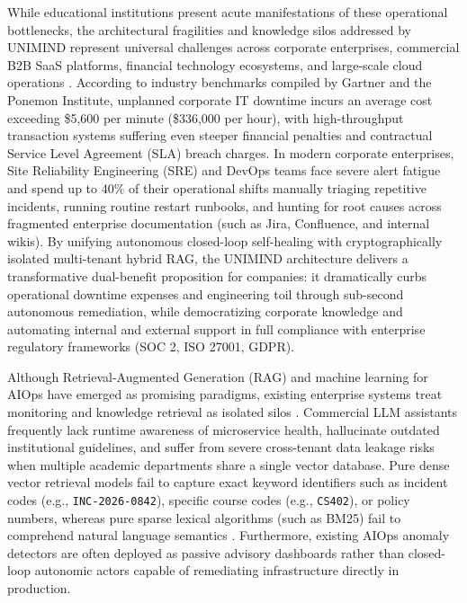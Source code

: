 \documentclass[12pt,onecolumn,draftclsnofoot]{IEEEtran}
\begin{document}
While educational institutions present acute manifestations of these operational bottlenecks, the architectural fragilities and knowledge silos addressed by UNIMIND represent universal challenges across corporate enterprises, commercial B2B SaaS platforms, financial technology ecosystems, and large-scale cloud operations \cite{beyer2016site}. According to industry benchmarks compiled by Gartner and the Ponemon Institute, unplanned corporate IT downtime incurs an average cost exceeding \$5,600 per minute (\$336,000 per hour), with high-throughput transaction systems suffering even steeper financial penalties and contractual Service Level Agreement (SLA) breach charges. In modern corporate enterprises, Site Reliability Engineering (SRE) and DevOps teams face severe alert fatigue and spend up to 40\% of their operational shifts manually triaging repetitive incidents, running routine restart runbooks, and hunting for root causes across fragmented enterprise documentation (such as Jira, Confluence, and internal wikis). By unifying autonomous closed-loop self-healing with cryptographically isolated multi-tenant hybrid RAG, the UNIMIND architecture delivers a transformative dual-benefit proposition for companies: it dramatically curbs operational downtime expenses and engineering toil through sub-second autonomous remediation, while democratizing corporate knowledge and automating internal and external support in full compliance with enterprise regulatory frameworks (SOC 2, ISO 27001, GDPR).

Although Retrieval-Augmented Generation (RAG) and machine learning for AIOps have emerged as promising paradigms, existing enterprise systems treat monitoring and knowledge retrieval as isolated silos \cite{lewis2020retrieval}. Commercial LLM assistants frequently lack runtime awareness of microservice health, hallucinate outdated institutional guidelines, and suffer from severe cross-tenant data leakage risks when multiple academic departments share a single vector database. Pure dense vector retrieval models fail to capture exact keyword identifiers such as incident codes (e.g., \texttt{INC-2026-0842}), specific course codes (e.g., \texttt{CS402}), or policy numbers, whereas pure sparse lexical algorithms (such as BM25) fail to comprehend natural language semantics \cite{robertson2009probabilistic}. Furthermore, existing AIOps anomaly detectors are often deployed as passive advisory dashboards rather than closed-loop autonomic actors capable of remediating infrastructure directly in production.
\end{document}
